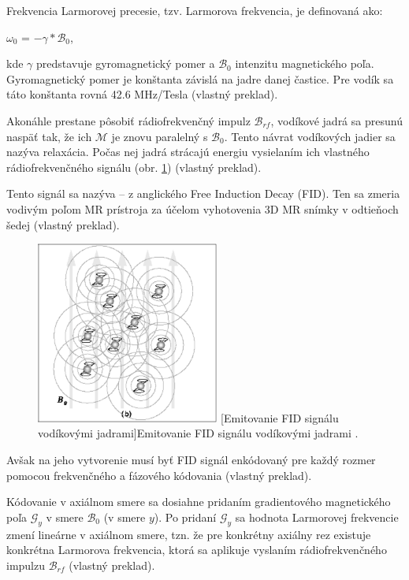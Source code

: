 Frekvencia Larmorovej precesie, tzv. Larmorova frekvencia, je definovaná ako:
\begin {center}
$\omega_{0}$ = $-\gamma * \mathcal{B}_{0}$,
\end {center}

kde $\gamma$ predstavuje gyromagnetický pomer a $\mathcal{B}_{0}$ intenzitu magnetického poľa.
Gyromagnetický pomer je konštanta závislá na jadre danej častice. Pre vodík sa táto konštanta rovná 42.6 MHz/Tesla \cite{basic_principles_of_mri} (vlastný preklad).

Akonáhle prestane pôsobiť rádiofrekvenčný impulz $\mathcal{B}_{rf}$, vodíkové jadrá sa presunú naspäť tak, že ich $\mathcal{M}$ je znovu paralelný s $\mathcal{B}_{0}$. Tento návrat vodíkových jadier sa nazýva relaxácia. Počas nej jadrá strácajú energiu vysielaním ich vlastného rádiofrekvenčného signálu (obr. \ref{fig:atoms_fid}) \cite{basic_principles_of_mri} (vlastný preklad).

Tento signál sa nazýva  -- z anglického Free Induction Decay (FID). Ten sa zmeria vodivým poľom MR prístroja za účelom vyhotovenia 3D MR snímky v odtieňoch šedej \cite{basic_principles_of_mri} (vlastný preklad).

\begin {figure}[H]
        \centering
        \includegraphics[height=6cm]{media/hydrogen/hydrogen_emitting_rf.png}
        \captionsetup{justification=centering}
        [Emitovanie FID signálu vodíkovými jadrami]{Emitovanie FID signálu vodíkovými jadrami \cite{basic_principles_of_mri}.}
        \label{fig:atoms_fid}
\end {figure}

Avšak na jeho vytvorenie musí byť FID signál enkódovaný pre každý rozmer pomocou frekvenčného a fázového kódovania \cite{basic_principles_of_mri} (vlastný preklad).

Kódovanie v axiálnom smere sa dosiahne pridaním gradientového magnetického poľa $\mathcal{G}_{y}$ v smere $\mathcal{B}_{0}$ (v smere $y$). Po pridaní $\mathcal{G}_{y}$ sa hodnota Larmorovej frekvencie zmení lineárne v axiálnom smere, tzn. že pre konkrétny axiálny rez existuje konkrétna Larmorova frekvencia, ktorá sa aplikuje vyslaním rádiofrekvenčného impulzu $\mathcal{B}_{rf}$ \cite{basic_principles_of_mri} (vlastný preklad).

